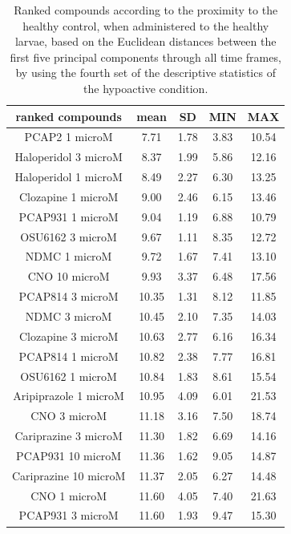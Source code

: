 \begin{table}[h!]\tiny
\centering
\caption{Ranked compounds according to the proximity to the healthy control, when administered to the healthy larvae, based on the Euclidean distances between the first five principal components through all time frames, by using the fourth set of the descriptive statistics of the hypoactive condition.}
\begin{tabular}{|c|c|c|c|c|}
\hline
ranked compounds             & mean & SD   & MIN  & MAX   \\ \hline
PCAP2 1 microM         & 7.71  & 1.78 & 3.83  & 10.54 \\ \hline
Haloperidol 3 microM   & 8.37  & 1.99 & 5.86  & 12.16 \\ \hline
Haloperidol 1 microM   & 8.49  & 2.27 & 6.30   & 13.25 \\ \hline
Clozapine 1 microM     & 9.00     & 2.46 & 6.15  & 13.46 \\ \hline
PCAP931 1 microM       & 9.04  & 1.19 & 6.88  & 10.79 \\ \hline
OSU6162 3 microM       & 9.67  & 1.11 & 8.35  & 12.72 \\ \hline
NDMC 1 microM          & 9.72  & 1.67 & 7.41  & 13.10  \\ \hline
CNO 10 microM          & 9.93  & 3.37 & 6.48  & 17.56 \\ \hline
PCAP814 3 microM       & 10.35 & 1.31 & 8.12  & 11.85 \\ \hline
NDMC 3 microM          & 10.45 & 2.10  & 7.35  & 14.03 \\ \hline
Clozapine 3 microM     & 10.63 & 2.77 & 6.16  & 16.34 \\ \hline
PCAP814 1 microM       & 10.82 & 2.38 & 7.77  & 16.81 \\ \hline
OSU6162 1 microM       & 10.84 & 1.83 & 8.61  & 15.54 \\ \hline
Aripiprazole 1 microM  & 10.95 & 4.09 & 6.01  & 21.53 \\ \hline
CNO 3 microM           & 11.18 & 3.16 & 7.50   & 18.74 \\ \hline
Cariprazine 3 microM   & 11.30  & 1.82 & 6.69  & 14.16 \\ \hline
PCAP931 10 microM      & 11.36 & 1.62 & 9.05  & 14.87 \\ \hline
Cariprazine 10 microM  & 11.37 & 2.05 & 6.27  & 14.48 \\ \hline
CNO 1 microM           & 11.60  & 4.05 & 7.40   & 21.63 \\ \hline
PCAP931 3 microM       & 11.60  & 1.93 & 9.47  & 15.30  \\ \hline

\end{tabular}
\end{table}
